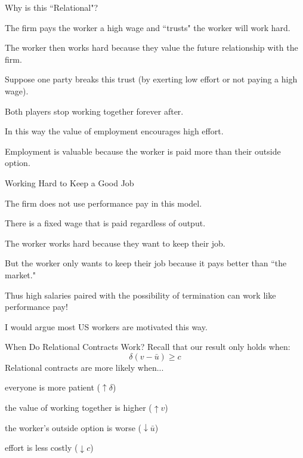\documentclass[aspectratio=169,usenames,dvipsnames]{beamer}
\newenvironment{wideitemize}{\itemize\addtolength{\itemsep}{10pt}}{\enditemize}
\begin{document}
\begin{frame}{Why is this ``Relational"?}

\begin{wideitemize}
    \item The firm pays the worker a high wage and ``trusts" the worker will work hard.
    \item The worker then works hard because they value the future relationship with the firm.
    \item Suppose one party breaks this trust (by exerting low effort or not paying a high wage).
    \item Both players stop working together forever after.
    \item In this way the value of employment encourages high effort.
    \item Employment is valuable because the worker is paid more than their outside option.
\end{wideitemize}
    
\end{frame}

\begin{frame}{Working Hard to Keep a Good Job}

\begin{wideitemize}
    \item The firm does not use performance pay in this model.
    \item There is a fixed wage that is paid regardless of output.
    \item The worker works hard because they want to keep their job.
    \item But the worker only wants to keep their job because it pays better than ``the market."
    \item Thus high salaries paired with the possibility of termination can work like performance pay!
    \item I would argue most US workers are motivated this way.
\end{wideitemize}
    
\end{frame}




\begin{frame}{When Do Relational Contracts Work?}
Recall that our result only holds when:
\[\delta(v-\bar u) \geq c\]
Relational contracts are more likely when...
\begin{wideitemize}
    \item  everyone is more patient ($\uparrow \delta $)
    \item the value of working together is higher ($\uparrow v $)
    \item the worker's outside option is worse ($\downarrow \bar u $)
    \item effort is less costly ($\downarrow c $)
\end{wideitemize}
    
\end{frame}
\end{document}
